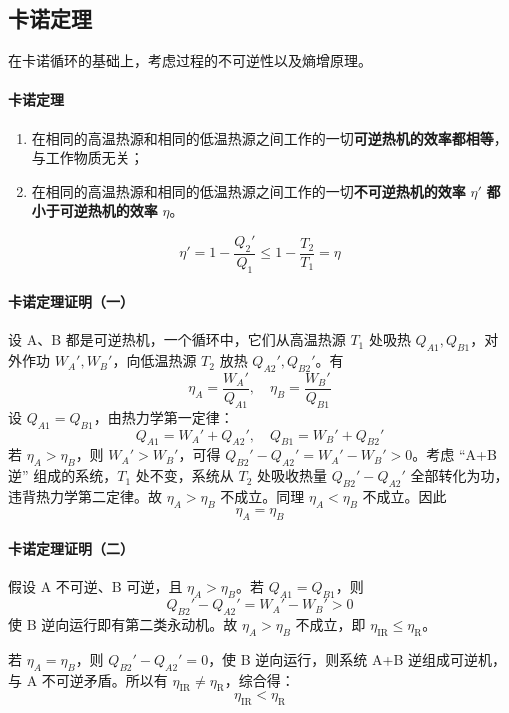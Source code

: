 \documentclass[UTF8]{ctexart}
\begin{document}

\subsection{卡诺定理}

在卡诺循环的基础上，考虑过程的不可逆性以及熵增原理。

\paragraph{卡诺定理}
\begin{enumerate}[leftmargin=2em]
  \item 在相同的高温热源和相同的低温热源之间工作的一切\textbf{可逆热机的效率都相等}，与工作物质无关；
  \item 在相同的高温热源和相同的低温热源之间工作的一切\textbf{不可逆热机的效率} $\eta'$ \textbf{都小于可逆热机的效率} $\eta$。
\end{enumerate}

\[
\boxed{\eta'=1-\frac{Q_2'}{Q_1}\le 1-\frac{T_2}{T_1}=\eta}
\]

\paragraph{卡诺定理证明（一）}
设 A、B 都是可逆热机，一个循环中，它们从高温热源 $T_1$ 处吸热 $Q_{A1},Q_{B1}$，对外作功 $W_A',W_B'$，向低温热源 $T_2$ 放热 $Q_{A2}',Q_{B2}'$。有
\[
\eta_A=\frac{W_A'}{Q_{A1}},\quad \eta_B=\frac{W_B'}{Q_{B1}}
\]
设 $Q_{A1}=Q_{B1}$，由热力学第一定律：
\[
Q_{A1}=W_A'+Q_{A2}',\quad Q_{B1}=W_B'+Q_{B2}'
\]
若 $\eta_A>\eta_B$，则 $W_A'>W_B'$，可得 $Q_{B2}'-Q_{A2}'=W_A'-W_B'>0$。考虑 ``A+B逆'' 组成的系统，$T_1$ 处不变，系统从 $T_2$ 处吸收热量 $Q_{B2}'-Q_{A2}'$ 全部转化为功，违背热力学第二定律。故 $\eta_A>\eta_B$ 不成立。同理 $\eta_A<\eta_B$ 不成立。因此
\[
\eta_A=\eta_B
\]

\paragraph{卡诺定理证明（二）}
假设 A 不可逆、B 可逆，且 $\eta_A>\eta_B$。若 $Q_{A1}=Q_{B1}$，则
\[
Q_{B2}'-Q_{A2}'=W_A'-W_B'>0
\]
使 B 逆向运行即有第二类永动机。故 $\eta_A>\eta_B$ 不成立，即 $\eta_{\mathrm{IR}}\le\eta_{\mathrm{R}}$。

若 $\eta_A=\eta_B$，则 $Q_{B2}'-Q_{A2}'=0$，使 B 逆向运行，则系统 A+B 逆组成可逆机，与 A 不可逆矛盾。所以有 $\eta_{\mathrm{IR}}\neq\eta_{\mathrm{R}}$，综合得：
\[
\boxed{\eta_{\mathrm{IR}}<\eta_{\mathrm{R}}}
\]
\end{document}
